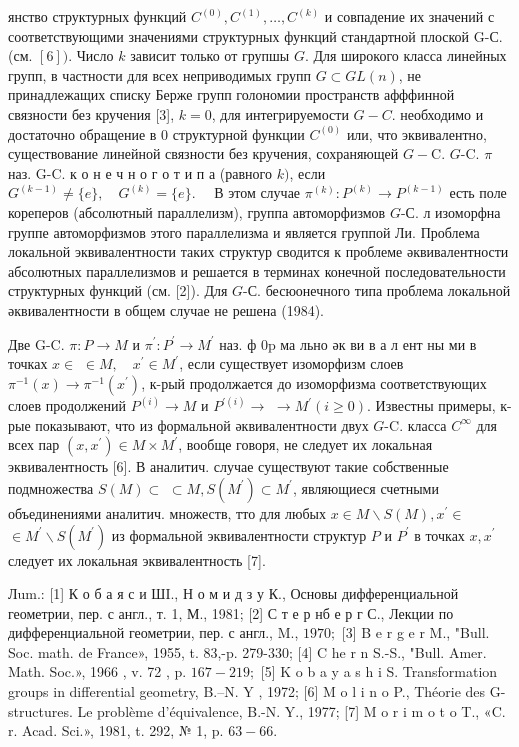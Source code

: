 \documentclass[10pt]{article}
\begin{document}
янство структурных функций $C^{(0)}, C^{(1)}, \ldots, C^{(k)}$ и совпадение их значений с соответствующими значениями структурных функций стандартной плоской G-С. (см. $[6])$. Число $k$ зависит только от групшы $G$. Для широкого класса линейных групп, в частности для всех неприводимых групп $G \subset G L(n)$, не принадлежащих списку Берже групп голономии пространств афффинной связности без кручения [3], $k=0$, для интегрируемости $G-C$. необходимо и достаточно обращение в 0 структурной функции $C^{(0)}$ или, что эквивалентно, существование линейной связности без кручения, сохраняющей $G-\mathrm{C}$. $G$-C. $\pi$ наз. G-C. к о н е ч н о г о т и п а (равного $k)$, если $G^{(k-1)} \neq\{e\}, \quad G^{(k)}=\{e\} . \quad$ В этом случае $\pi^{(k)}: P^{(k)} \rightarrow P^{(k-1)}$ есть поле кореперов (абсолютный параллелизм), группа автоморфизмов $G$-С. л изоморфна группе автоморфизмов этого параллелизма и является группой Ли. Проблема локальной эквивалентности таких структур сводится к проблеме әквивалентности абсолютных параллелизмов и решается в терминах конечной последовательности структурных функций (см. [2]). Для $G$-С. бесюонечного типа проблема локальной әквивалентности в общем случае не решена (1984).



Две G-C. $\pi: P \rightarrow M$ и $\pi^{\prime}: P^{\prime} \rightarrow M^{\prime}$ наз. ф $0 \mathrm{p}$ ма льно әк ви в а л ент ны ми в точках $x \in$ $\in M, \quad x^{\prime} \in M^{\prime}$, если существует изоморфизм слоев $\pi^{-1}(x) \rightarrow \pi^{-1}\left(x^{\prime}\right)$, к-рый продолжается до изоморфизма соответствующих слоев продолжений $P^{(i)} \rightarrow M$ и $P^{\prime(i)} \rightarrow$ $\rightarrow M^{\prime}(i \geqslant 0)$. Известны примеры, к-рые показывают, что из формальной әквивалентности двух $G$-C. класса $C^{\infty}$ для всех пар $\left(x, x^{\prime}\right) \in M \times M^{\prime}$, вообще говоря, не следует их локальная эквивалентность [6]. В аналитич. случае существуют такие собственные подмножества $S(M) \subset$ $\subset M, S\left(M^{\prime}\right) \subset M^{\prime}$, являющиеся счетными объединениями аналитич. множеств, тто для любых $x \in M \backslash S(M), x^{\prime} \in$ $\in M^{\prime} \backslash S\left(M^{\prime}\right)$ из формальной эквивалентности структур $P$ и $P^{\prime}$ в точках $x, x^{\prime}$ следует их локальная эквивалентность [7].



Лum.: [1] К о б а я с и ШI., Н о м и д з у К., Основы дифференциальной геометрии, пер. с англ., т. 1, М., 1981; [2] С т е р нб е р г С., Лекции по дифференциальной геометрии, пер. с англ., M., $1970 ;$ [3] B e r g e r M., "Bull. Soc. math. de France», 1955, t. 83,-p. 279-330; [4] C he r n S.-S., "Bull. Amer. Math. Soc.», 1966 , v. 72 , p. $167-219 ;$ [5] K o b a y a s h i S. Transformation groups in differential geometry, B.--N. Y , 1972; [6] M o l i n o P., Théorie des G-structures. Le problème d'équivalence, B.-N. Y., 1977; [7] M o r i m o t o T., «C. r. Acad. Sci.», 1981, t. 292, № 1, p. $63-66$.
\end{document}

